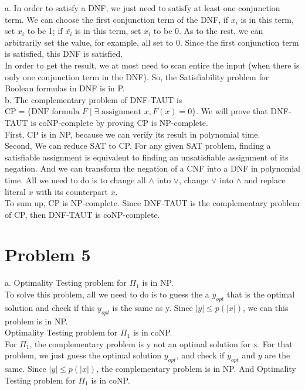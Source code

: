 \documentclass[12pt]{article}
\begin{document}
a. In order to satisfy a DNF, we just need to satisfy at least one
conjunction term. We can choose the first conjunction term of the DNF,
if $x_i$ is in this term, set $x_i$ to be 1; if $\bar {x_i}$ is in
this term, set $x_i$ to be 0. As to the rest, we can arbitrarily set
the value, for example, all set to 0. Since the first conjunction term
is satisfied, this DNF is satisfied. \\

In order to get the result, we at most need to scan entire the input
(when there is only one conjunction term in the DNF). So, the
Satisfiability problem for Boolean formulas in DNF is in P. \\

b. The complementary problem of DNF-TAUT is $\text {CP} = \{ \text{DNF
  formula } F \; | \; \exists \text { assignment } x, F(x) = 0 \}$. We
will prove that DNF-TAUT is coNP-complete by proving CP is
NP-complete. \\

First, CP is in NP, because we can verify its result in polynomial
time. \\

Second, We can reduce SAT to CP. For any given SAT problem, finding a
satisfiable assignment is equivalent to finding an unsatisfiable
assignment of its negation. And we can transform the negation of a CNF
into a DNF in polynomial time. All we need to do is to change all
$\land$ into $\lor$, change $\lor$ into $\land$ and replace literal
$x$ with its counterpart $\bar {x}$. \\

To sum up, CP is NP-complete. Since DNF-TAUT is the complementary
problem of CP, then DNF-TAUT is coNP-complete.

\section*{Problem 5}

a. Optimality Testing problem for $\Pi_1$ is in NP. \\

To solve this problem, all we need to do is to guess the a $y_{opt}$
that is the optimal solution and check if this $y_{opt}$ is the same
as y. Since $|y| \le p(|x|)$, we can this problem is in NP. \\

Optimality Testing problem for $\Pi_1$ is in coNP. \\

For $\Pi_1$, the complementary problem is y not an optimal solution for
x. For that problem, we just guess the optimal solution $y_{opt}$, and check
if $y_{opt}$ and $y$ are the same.  Since $|y| \le p(|x|)$, the
complementary problem is in NP. And Optimality Testing problem for
$\Pi_1$ is in coNP. \\
\end{document}
